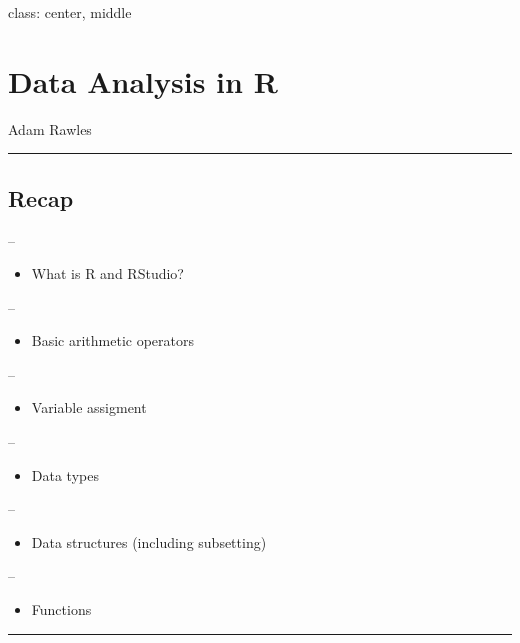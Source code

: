 \documentclass[]{article}
\title{}
\author{}
\date{}
\providecommand{\tightlist}{%
  \setlength{\itemsep}{0pt}\setlength{\parskip}{0pt}}
\begin{document}
class: center, middle

\hypertarget{data-analysis-in-r}{%
\section{Data Analysis in R}\label{data-analysis-in-r}}

Adam Rawles

\begin{center}\rule{0.5\linewidth}{\linethickness}\end{center}

\hypertarget{recap}{%
\subsection{Recap}\label{recap}}

--

\begin{itemize}
\tightlist
\item
  What is R and RStudio?
\end{itemize}

--

\begin{itemize}
\tightlist
\item
  Basic arithmetic operators
\end{itemize}

--

\begin{itemize}
\tightlist
\item
  Variable assigment
\end{itemize}

--

\begin{itemize}
\tightlist
\item
  Data types
\end{itemize}

--

\begin{itemize}
\tightlist
\item
  Data structures (including subsetting)
\end{itemize}

--

\begin{itemize}
\tightlist
\item
  Functions
\end{itemize}

\begin{center}\rule{0.5\linewidth}{\linethickness}\end{center}
\end{document}
